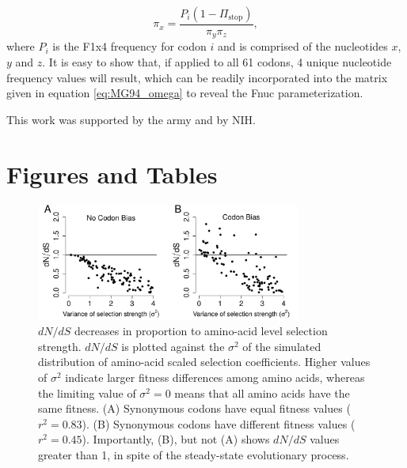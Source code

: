 \documentclass{pnastwo}
\begin{document}
\begin{article}
\begin{equation}
\pi_x = \frac{P_i(1 - \Pi_\text{stop})}{\pi_y\pi_z}, 
\end{equation} where $P_i$ is the F1x4 frequency for codon $i$ and is comprised of the nucleotides $x$, $y$ and $z$. It is easy to show that, if applied to all 61 codons, 4 unique nucleotide frequency values will result, which can be readily incorporated into the matrix given in equation \eqref{eq:MG94_omega} to reveal the Fnuc parameterization.

		
\begin{acknowledgments}
	This work was supported by the army and by NIH.
\end{acknowledgments}
		

		
		


		
		
\end{article}
	
	
\section*{Figures and Tables }

\vspace{2cm}
	
\begin{figure}[htbp]
	\centerline{\includegraphics[width=8.7cm]{figures/MainText/dnds_variance.pdf}}
	\caption{\label{dnds_variance} $dN/dS$ decreases in proportion to amino-acid level selection strength. $dN/dS$ is plotted against the $\sigma^2 $ of the simulated distribution of amino-acid scaled selection coefficients. Higher values of $\sigma^2$ indicate larger fitness differences among amino acids, whereas the limiting value of $\sigma^2 = 0$ means that all amino acids have the same fitness. (A) Synonymous codons have equal fitness values ($r^2=0.83$). (B) Synonymous codons have different fitness values ($r^2=0.45$). Importantly, (B), but not (A) shows $dN/dS$ values greater than 1, in spite of the steady-state evolutionary process.}
\end{figure}
		
\end{document}
